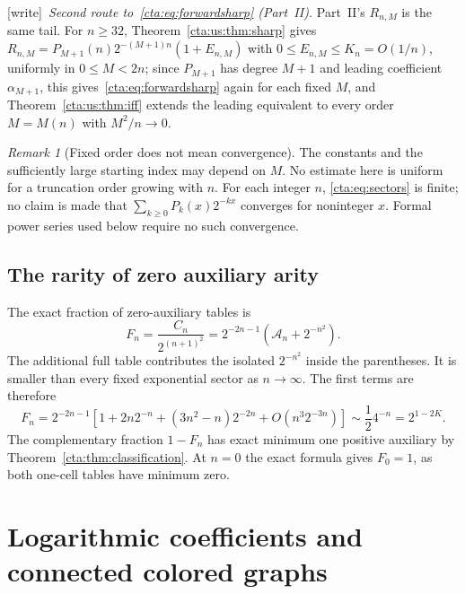 \documentclass[11pt]{article}
\theoremstyle{definition}
\theoremstyle{remark}
\newtheorem{remark}[theorem]{Remark}
\newcommand{\As}{\mathcal A}
\newcommand{\wtag}{\textup{[write]}}
\begin{document}
\wtag\ \emph{Second route to~\eqref{cta:eq:forwardsharp} (Part~II).}
Part~II's $R_{n,M}$ is the same tail. For $n\ge32$,
Theorem~\ref{cta:us:thm:sharp} gives
$R_{n,M}=P_{M+1}(n)2^{-(M+1)n}(1+E_{n,M})$ with $0\le E_{n,M}\le K_n=O(1/n)$,
uniformly in $0\le M<2n$; since $P_{M+1}$ has degree $M+1$ and leading
coefficient $\alpha_{M+1}$, this gives~\eqref{cta:eq:forwardsharp} again
for each fixed $M$, and Theorem~\ref{cta:us:thm:iff} extends the leading
equivalent to every order $M=M(n)$ with $M^2/n\to0$.

\begin{remark}[Fixed order does not mean convergence]\label{cta:rem:fixed}
The constants and the sufficiently large starting index may depend on $M$.
No estimate here is uniform for a truncation order growing with $n$.
For each integer $n$, \eqref{cta:eq:sectors} is finite; no claim is made that
$\sum_{k\geq0}P_k(x)2^{-kx}$ converges for noninteger $x$.
Formal power series used below require no such convergence.
\end{remark}

\subsection{The rarity of zero auxiliary arity}

The exact fraction of zero-auxiliary tables is
\begin{equation}\label{cta:eq:fraction}
 F_n=\frac{C_n}{2^{(n+1)^2}}
 =2^{-2n-1}\left(\As_n+2^{-n^2}\right).
\end{equation}
The additional full table contributes the isolated $2^{-n^2}$ inside
the parentheses. It is smaller than every fixed exponential sector as
$n\to\infty$. The first terms are therefore
\begin{equation}\label{cta:eq:rarity}
 F_n=2^{-2n-1}\left[1+2n2^{-n}+(3n^2-n)2^{-2n}
                    +O(n^3 2^{-3n})\right]
 \sim\frac12 4^{-n}=2^{1-2K}.
\end{equation}
The complementary fraction $1-F_n$ has exact minimum one positive
auxiliary by Theorem~\ref{cta:thm:classification}. At $n=0$ the exact formula
gives $F_0=1$, as both one-cell tables have minimum zero.

\section{Logarithmic coefficients and connected colored graphs}\label{cta:sec:logs}
\end{document}
